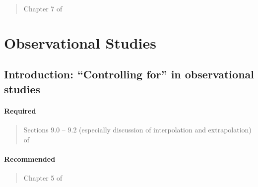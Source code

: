 \documentclass[12pt]{article}
\begin{document}
\begin{verse} Chapter 7 of  \end{verse}

\begin{verse}  \end{verse}

\begin{verse}  \end{verse}

\begin{verse}  \end{verse}

\begin{verse}  \end{verse}

\section{Observational Studies}

\subsection{Introduction:  ``Controlling for'' in observational studies}

\paragraph*{Required}

\begin{verse}  \end{verse}

\begin{verse} Sections 9.0 -- 9.2 (especially discussion of interpolation and extrapolation) of  \end{verse}


\paragraph*{Recommended}

\begin{verse} Chapter 5 of  \end{verse}

\begin{verse}  \end{verse}
\end{document}
